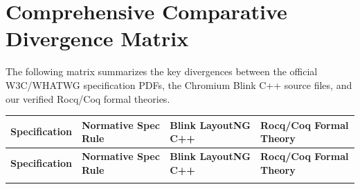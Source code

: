 \documentclass[11pt,a4paper]{article}
\theoremstyle{definition}
\begin{document}
\newpage
\section{Comprehensive Comparative Divergence Matrix}

The following matrix summarizes the key divergences between the official W3C/WHATWG specification PDFs, the Chromium Blink C++ source files, and our verified Rocq/Coq formal theories.

\begingroup
\small
\begin{longtable}{p{2.3cm}p{3.8cm}p{4.4cm}p{4.5cm}}
\toprule
\textbf{Specification} & \textbf{Normative Spec Rule} & \textbf{Blink LayoutNG C++} & \textbf{Rocq/Coq Formal Theory} \\
\midrule
\endfirsthead
\toprule
\textbf{Specification} & \textbf{Normative Spec Rule} & \textbf{Blink LayoutNG C++} & \textbf{Rocq/Coq Formal Theory} \\
\midrule
\endhead
\bottomrule
\endfoot
\bottomrule
\endlastfoot


\end{longtable}
\end{document}
